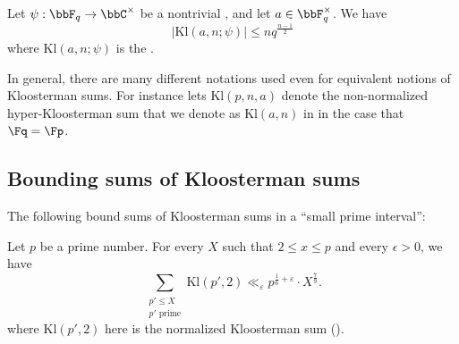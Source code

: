 \begin{proposition} \label{proposition:bound_on_nonnormalized_hyper_kloosterman_sums}
    Let $\psi: \bbF_q \to \bbC^\times$ be a nontrivial , and let $a \in \bbF_q^\times$. We have 
    $$|\mathrm{Kl}(a,n;\psi)| \leq n q^{\frac{n-1}{2}}$$
    where $\mathrm{Kl}(a,n;\psi)$ is the .
\end{proposition}

\begin{remark}
In general, there are many different notations used even for equivalent notions of Kloosterman sums. For instance \cite{katz_gsksmg} lets $\mathrm{Kl}(p,n,a)$ denote the non-normalized hyper-Kloosterman sum that we denote as $\mathrm{Kl}(a,n)$ in  in the case that $\Fq = \Fp$.
\end{remark}

\subsection{Bounding sums of Kloosterman sums}


The following bound sums of Kloosterman sums in a ``small prime interval'':
\begin{theorem} \label{theorem:bound_of_sum_of_kloosterman_sums_in_small_prime_interval_by_blomer_et_al}
    Let $p$ be a prime number. For every $X$ such that $2 \leq x \leq p$ and every $\epsilon > 0$, we have 
    $$\sum_{\substack{p' \leq X \\ p' \text{ prime}}} \mathrm{Kl}(p', 2) \ll_\varepsilon p^{\frac{1}{6} + \varepsilon} \cdot X^{\frac{7}{9}}.$$
    where $\mathrm{Kl}(p', 2)$ here is the normalized Kloosterman sum ().
\end{theorem}

